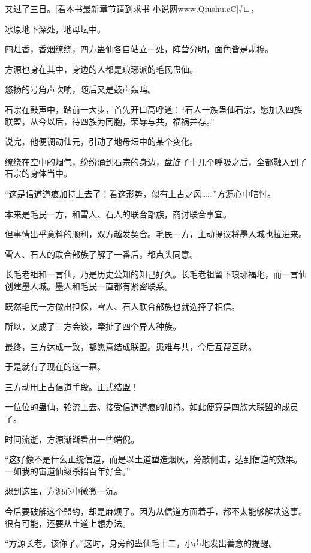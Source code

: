 
\begin{this_body}

又过了三日。[看本书最新章节请到求书 小说网www.Qiushu.cC]√∟，

冰原地下深处，地母坛中。

四炷香，香烟缭绕，四方蛊仙各自站立一处，阵营分明，面色皆是肃穆。

方源也身在其中，身边的人都是琅琊派的毛民蛊仙。

悠扬的号角声吹响，随后又是鼓声轰鸣。

石宗在鼓声中，踏前一大步，首先开口高呼道：“石人一族蛊仙石宗，愿加入四族联盟，从今以后，待四族为同胞，荣辱与共，福祸并存。”

说完，他便调动仙元，引动了地母坛中的某个变化。

缭绕在空中的烟气，纷纷涌到石宗的身边，盘旋了十几个呼吸之后，全都融入到了石宗的身体当中。

“这是信道道痕加持上去了！看这形势，似有上古之风……”方源心中暗忖。

本来是毛民一方，和雪人、石人的联合部族，商讨联合事宜。

但事情出乎意料的顺利，双方越发契合。毛民一方，主动提议将墨人城也拉进来。

雪人、石人的联合部族了解了一番后，都点头同意。

长毛老祖和一言仙，乃是历史公知的知己好久。长毛老祖留下琅琊福地，而一言仙创建墨人城。墨人和毛民一直都有紧密联系。

既然毛民一方做出担保，雪人、石人联合部族也就选择了相信。

所以，又成了三方会谈，牵扯了四个异人种族。

最终，三方达成一致，都愿意结成联盟。患难与共，今后互帮互助。

于是就有了现在的这一幕。

三方动用上古信道手段。正式结盟！

一位位的蛊仙，轮流上去。接受信道道痕的加持。如此便算是四族大联盟的成员了。

时间流逝，方源渐渐看出一些端倪。

“这好像不是什么正统信道，而是以土道塑造烟灰，旁敲侧击，达到信道的效果。一如我的宙道仙级杀招百年好合。”

想到这里，方源心中微微一沉。

今后要破解这个盟约，却是麻烦了。因为从信道方面着手，都不太能够解决这事。很有可能，还要从土道上想办法。

“方源长老。该你了。”这时，身旁的蛊仙毛十二，小声地发出善意的提醒。


\end{this_body}
